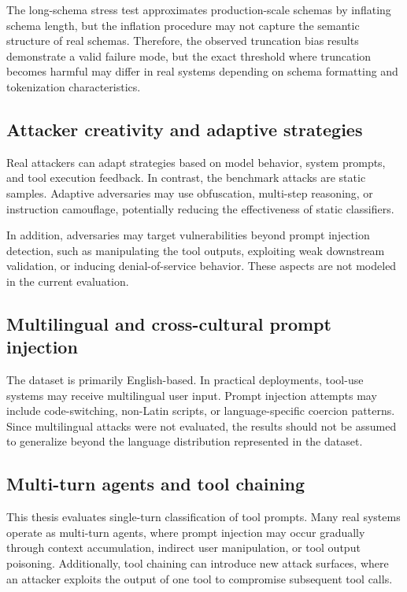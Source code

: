 The long-schema stress test approximates production-scale schemas by inflating schema length, but the inflation procedure may not capture the semantic structure of real schemas. Therefore, the observed truncation bias results demonstrate a valid failure mode, but the exact threshold where truncation becomes harmful may differ in real systems depending on schema formatting and tokenization characteristics.

\subsection{Attacker creativity and adaptive strategies}
Real attackers can adapt strategies based on model behavior, system prompts, and tool execution feedback. In contrast, the benchmark attacks are static samples. Adaptive adversaries may use obfuscation, multi-step reasoning, or instruction camouflage, potentially reducing the effectiveness of static classifiers.

In addition, adversaries may target vulnerabilities beyond prompt injection detection, such as manipulating the tool outputs, exploiting weak downstream validation, or inducing denial-of-service behavior. These aspects are not modeled in the current evaluation.

\subsection{Multilingual and cross-cultural prompt injection}
The dataset is primarily English-based. In practical deployments, tool-use systems may receive multilingual user input. Prompt injection attempts may include code-switching, non-Latin scripts, or language-specific coercion patterns. Since multilingual attacks were not evaluated, the results should not be assumed to generalize beyond the language distribution represented in the dataset.

\subsection{Multi-turn agents and tool chaining}
This thesis evaluates single-turn classification of tool prompts. Many real systems operate as multi-turn agents, where prompt injection may occur gradually through context accumulation, indirect user manipulation, or tool output poisoning. Additionally, tool chaining can introduce new attack surfaces, where an attacker exploits the output of one tool to compromise subsequent tool calls.

